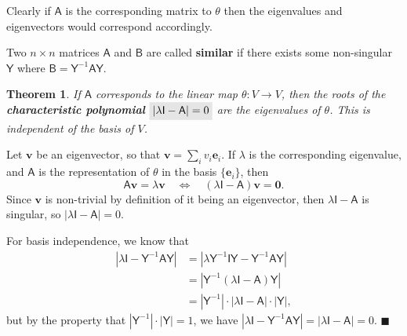 \documentclass[letter-paper]{tufte-book}
\newtheorem{theorem}{\color{pastel-blue}Theorem}[section]
\newenvironment{proof}[1][Proof]{\begin{trivlist}
\item[\hskip \labelsep {\bfseries #1}]}{\end{trivlist}}
\newcommand{\As}{{\mathsf{A}}}
\newcommand{\Bs}{{\mathsf{B}}}
\newcommand{\Is}{{\mathsf{I}}}
\newcommand{\Ys}{{\mathsf{Y}}}
\newcommand{\Ob}{{\boldsymbol{0}}}
\newcommand{\eb}{{\boldsymbol{e}}}
\newcommand{\vb}{{\boldsymbol{v}}}
\newcommand{\qed}{\hfill$\blacksquare$}
\newcommand{\highlight}[1]{\mathchoice%
  {\colorbox{black!10}{$\displaystyle#1$}}%
  {\colorbox{black!10}{$\textstyle#1$}}%
  {\colorbox{black!10}{$\scriptstyle#1$}}%
  {\colorbox{black!10}{$\scriptscriptstyle#1$}}}%
\begin{document}
Clearly if $\As$ is the corresponding matrix to $\theta$ then the eigenvalues
and eigenvectors would correspond accordingly.

Two $n\times n$ matrices $\As$ and $\Bs$ are called \textbf{similar} if there
exists some non-singular $\Ys$ where $\Bs = \Ys^{-1} \As \Ys$.

\begin{theorem}
  If $\As$ corresponds to the linear map $\theta:V\to V$, then the roots of the
  \textbf{characteristic polynomial} $\highlight{|\lambda\Is - \As| = 0}$ are
  the eigenvalues of $\theta$. This is independent of the basis of $V$.
\end{theorem}

\begin{proof}
  Let $\vb$ be an eigenvector, so that $\vb=\sum_i v_i\eb_i$. If $\lambda$ is
  the corresponding eigenvalue, and $\textsf{A}$ is the representation of
  $\theta$ in the basis $\{\eb_i\}$, then
  \begin{equation*}
    \As\vb = \lambda\vb \quad \Leftrightarrow \quad (\lambda\Is - \As)\vb = \Ob.
  \end{equation*}
  Since $\vb$ is non-trivial by definition of it being an eigenvector, then
  $\lambda\Is - \As$ is singular, so $|\lambda\Is - \As| = 0$.
  
  For basis independence, we know that
  \begin{align*}
    |\lambda\Is - \Ys^{-1}\As\Ys| &= |\lambda\Ys^{-1}\Is\Ys - \Ys^{-1}\As\Ys| \\
      & = |\Ys^{-1}(\lambda\Is- \As)\Ys|\\
      & = |\Ys^{-1}| \cdot |\lambda\Is- \As| \cdot |\Ys|,
  \end{align*}
  but by the property that $|\Ys^{-1}| \cdot |\Ys| = 1$, we have $|\lambda\Is -
  \Ys^{-1}\As\Ys| = |\lambda\Is- \As| = 0$. \qed
\end{proof}
\end{document}
